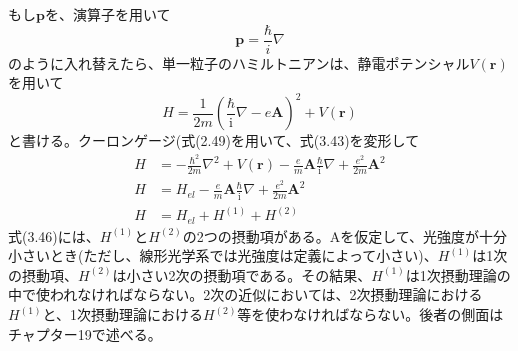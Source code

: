 \documentclass[11pt,a4j,uplatex]{jsarticle}
\begin{document}
もし$\bm{p}$を、演算子を用いて
\begin{equation}
  \bm{p}=\frac{\hbar}{i}\nabla\tag{3.42}
\end{equation}
のように入れ替えたら、単一粒子のハミルトニアンは、静電ポテンシャル$V(\bm{r})$を用いて
\begin{equation}
  H=\frac{1}{2m}(\frac{\hbar}{\mathrm{i}}\nabla-e\bm{A})^2+V(\bm{r})\tag{3.43}
\end{equation}
と書ける。クーロンゲージ(式(2.49)を用いて、式(3.43)を変形して
  \begin{align}
    H&=-\frac{\hbar^2}{2m}\nabla^2+V(\bm{r})-\frac{e}{m}\bm{A}\frac{\hbar}{\mathrm{i}}\nabla+\frac{e^2}{2m}\bm{A}^2\tag{3.44}\\
    H&=H_{el}-\frac{e}{m}\bm{A}\frac{\hbar}{\mathrm{i}}\nabla+\frac{e^2}{2m}\bm{A}^2\tag{3.45}\\
    H&=H_{el}+H^{(1)}+H^{(2)}\tag{3.46}
  \end{align}
式(3.46)には、$H^{(1)}$と$H^{(2)}$の2つの摂動項がある。Aを仮定して、光強度が十分小さいとき(ただし、線形光学系では光強度は定義によって小さい)、$H^{(1)}$は1次の摂動項、$H^{(2)}$は小さい2次の摂動項である。その結果、$H^{(1)}$は1次摂動理論の中で使われなければならない。2次の近似においては、2次摂動理論における$H^{(1)}$と、1次摂動理論における$H^{(2)}$等を使わなければならない。後者の側面はチャプター19で述べる。%
\end{document}
